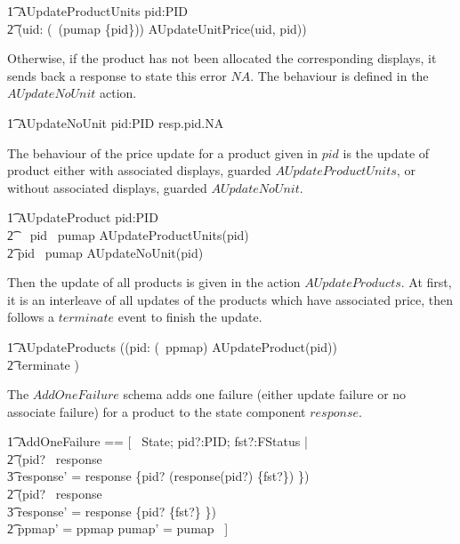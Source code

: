 \begin{circusaction}
        \t1 AUpdateProductUnits \circdef pid:PID \circspot \\
            \t2 (\Interleave uid: (\dom~(pumap \rres \{pid\})) \linter \emptyset \rinter \circspot AUpdateUnitPrice(uid, pid)) \\
\end{circusaction}
Otherwise, if the product has not been allocated the corresponding displays, it sends back a response to state this error $NA$. The behaviour is defined in the $AUpdateNoUnit$ action. 
\begin{circusaction}
        \t1 AUpdateNoUnit \circdef  pid:PID \circspot resp.pid.NA \then \Skip \\ 
\end{circusaction}

The behaviour of the price update for a product given in $pid$ is the update of product either with associated displays, guarded $AUpdateProductUnits$, or without associated displays, guarded $AUpdateNoUnit$.  
\begin{circusaction}
        \t1 AUpdateProduct \circdef pid:PID \circspot \\
            \t2 \,\,\,\, \lcircguard pid \in \ran~pumap \rcircguard \circguard AUpdateProductUnits(pid) \\
            \t2 \extchoice \lcircguard pid \notin \ran~pumap \rcircguard \circguard AUpdateNoUnit(pid) \\
\end{circusaction}

Then the update of all products is given in the action $AUpdateProducts$. At first, it is an interleave of all updates of the products which have associated price, then follows a $terminate$ event to finish the update.
\begin{circusaction}
        \t1 AUpdateProducts \circdef ((\Interleave pid: (\dom~ppmap) \linter \emptyset \rinter \circspot AUpdateProduct(pid)) \\
        \t2 \circseq terminate \then \Skip) \\
\end{circusaction}

The $AddOneFailure$ schema adds one failure (either update failure or no associate failure) for a product to the state component $response$. 
\begin{zed}
    \t1 AddOneFailure == [~ \Delta State; pid?:PID; fst?:FStatus | \\
        \t2 (pid? \in \dom~response \implies \\
            \t3 response' = response \oplus \{pid? \mapsto (response(pid?) \cup \{fst?\}) \}) \land \\
        \t2 (pid? \notin \dom~response \implies \\
            \t3 response' = response \cup \{pid? \mapsto \{fst?\} \}) \land \\
        \t2 ppmap' = ppmap \land pumap' = pumap ~]
\end{zed}

